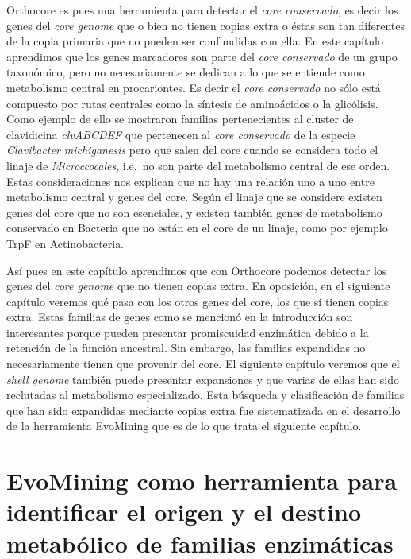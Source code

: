 \documentclass[12pt,twoside]{reedthesis}
\begin{document}
  Orthocore es pues una herramienta para detectar el \emph{core
  conservado}, es decir los genes del \emph{core genome} que o bien no
  tienen copias extra o éstas son tan diferentes de la copia primaria que
  no pueden ser confundidas con ella. En este capítulo aprendimos que los
  genes marcadores son parte del \emph{core conservado} de un grupo
  taxonómico, pero no necesariamente se dedican a lo que se entiende como
  metabolismo central en procariontes. Es decir el \emph{core conservado}
  no sólo está compuesto por rutas centrales como la síntesis de
  aminoácidos o la glicólisis. Como ejemplo de ello se mostraron familias
  pertenecientes al cluster de clavidicina \emph{clvABCDEF} que pertenecen
  al \emph{core conservado} de la especie \emph{Clavibacter michiganesis}
  pero que salen del core cuando se considera todo el linaje de
  \emph{Microccocales}, i.e.~no son parte del metabolismo central de ese
  orden. Estas consideraciones nos explican que no hay una relación uno a
  uno entre metabolismo central y genes del core. Según el linaje que se
  considere existen genes del core que no son esenciales, y existen
  también genes de metabolismo conservado en Bacteria que no están en el
  core de un linaje, como por ejemplo TrpF en Actinobacteria.
  
  Así pues en este capítulo aprendimos que con Orthocore podemos detectar
  los genes del \emph{core genome} que no tienen copias extra. En
  oposición, en el siguiente capítulo veremos qué pasa con los otros genes
  del core, los que sí tienen copias extra. Estas familias de genes como
  se mencionó en la introducción son interesantes porque pueden presentar
  promiscuidad enzimática debido a la retención de la función ancestral.
  Sin embargo, las familias expandidas no necesariamente tienen que
  provenir del core. El siguiente capítulo veremos que el \emph{shell
  genome} también puede presentar expansiones y que varias de ellas han
  sido reclutadas al metabolismo especializado. Esta búsqueda y
  clasificación de familias que han sido expandidas mediante copias extra
  fue sistematizada en el desarrollo de la herramienta EvoMining que es de
  lo que trata el siguiente capítulo.
  
  \chapter{EvoMining como herramienta para identificar el origen y el
  destino metabólico de familias
  enzimáticas}\label{evomining-como-herramienta-para-identificar-el-origen-y-el-destino-metabolico-de-familias-enzimaticas}
  
\end{document}
